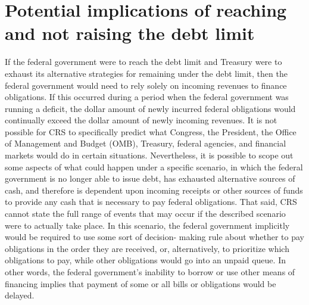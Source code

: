 \section{Potential implications of reaching and not raising the debt limit}
\label{sec:Implications}

If the federal government were to reach the debt limit and Treasury were to exhaust its alternative strategies for remaining under the debt limit, then the federal government would need to rely solely on incoming revenues to finance obligations. If this occurred during a period when the federal government was running a deficit, the dollar amount of newly incurred federal obligations would continually exceed the dollar amount of newly incoming revenues.
\nextline
It is not possible for CRS to specifically predict what Congress, the President, the Office of Management and Budget (OMB), Treasury, federal agencies, and financial markets would do in certain situations. Nevertheless, it is possible to scope out some aspects of what could happen under a specific scenario, in which the federal government is no longer able to issue debt, has exhausted alternative sources of cash, and therefore is dependent upon incoming receipts or other sources of funds to provide any cash that is necessary to pay federal obligations. That said, CRS cannot state the full range of events that may occur if the described scenario were to actually take place.
\nextline
In this scenario, the federal government implicitly would be required to use some sort of decision- making rule about whether to pay obligations in the order they are received, or, alternatively, to prioritize which obligations to pay, while other obligations would go into an unpaid queue. In other words, the federal government’s inability to borrow or use other means of financing implies that payment of some or all bills or obligations would be delayed.

